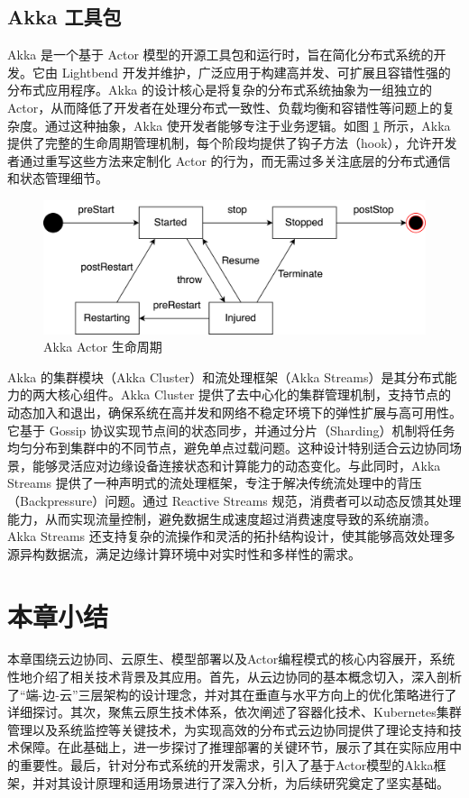 \subsection{Akka 工具包}

Akka 是一个基于 Actor 模型的开源工具包和运行时，旨在简化分布式系统的开发。它由 Lightbend 开发并维护，广泛应用于构建高并发、可扩展且容错性强的分布式应用程序。Akka 的设计核心是将复杂的分布式系统抽象为一组独立的 Actor，从而降低了开发者在处理分布式一致性、负载均衡和容错性等问题上的复杂度。通过这种抽象，Akka 使开发者能够专注于业务逻辑。如图 \ref{fig:2-8akka} 所示，Akka 提供了完整的生命周期管理机制，每个阶段均提供了钩子方法（hook），允许开发者通过重写这些方法来定制化 Actor 的行为，而无需过多关注底层的分布式通信和状态管理细节。

\begin{figure}[ht]
  \centering
  \includegraphics[width=0.8\linewidth]{pics/2-8akka.png}
  \caption{Akka Actor 生命周期}
  \label{fig:2-8akka}
\end{figure} 

Akka 的集群模块（Akka Cluster）和流处理框架（Akka Streams）是其分布式能力的两大核心组件。Akka Cluster 提供了去中心化的集群管理机制，支持节点的动态加入和退出，确保系统在高并发和网络不稳定环境下的弹性扩展与高可用性。它基于 Gossip 协议实现节点间的状态同步，并通过分片（Sharding）机制将任务均匀分布到集群中的不同节点，避免单点过载问题。这种设计特别适合云边协同场景，能够灵活应对边缘设备连接状态和计算能力的动态变化。与此同时，Akka Streams 提供了一种声明式的流处理框架，专注于解决传统流处理中的背压（Backpressure）问题。通过 Reactive Streams 规范，消费者可以动态反馈其处理能力，从而实现流量控制，避免数据生成速度超过消费速度导致的系统崩溃。Akka Streams 还支持复杂的流操作和灵活的拓扑结构设计，使其能够高效处理多源异构数据流，满足边缘计算环境中对实时性和多样性的需求。

\section{本章小结}

本章围绕云边协同、云原生、模型部署以及Actor编程模式的核心内容展开，系统性地介绍了相关技术背景及其应用。首先，从云边协同的基本概念切入，深入剖析了“端-边-云”三层架构的设计理念，并对其在垂直与水平方向上的优化策略进行了详细探讨。其次，聚焦云原生技术体系，依次阐述了容器化技术、Kubernetes集群管理以及系统监控等关键技术，为实现高效的分布式云边协同提供了理论支持和技术保障。在此基础上，进一步探讨了推理部署的关键环节，展示了其在实际应用中的重要性。最后，针对分布式系统的开发需求，引入了基于Actor模型的Akka框架，并对其设计原理和适用场景进行了深入分析，为后续研究奠定了坚实基础。

